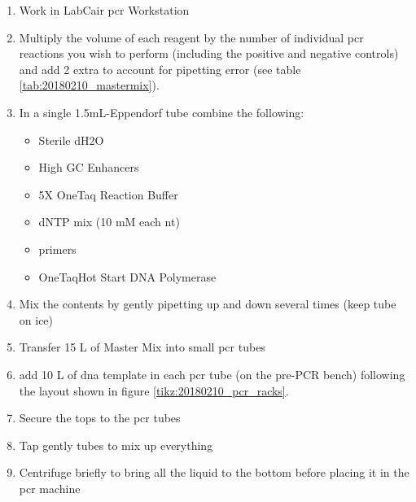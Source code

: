 \begin{enumerate}
\item Work in LabCair \gls{pcr} Workstation
\item Multiply the volume of each reagent by the number of individual \gls{pcr} reactions you wish to perform (including the positive and negative controls) and add 2 extra to account for pipetting error (see table \ref{tab:20180210_mastermix}).
\item In a single 1.5mL-Eppendorf tube combine the following:
	\begin{itemize}
	\item Sterile dH2O
	\item High GC Enhancers
	\item 5X OneTaq Reaction Buffer
	\item dNTP mix (10 mM each nt)
	\item primers
	\item OneTaq\cR Hot Start DNA Polymerase
	\end{itemize}
\item Mix the contents by gently pipetting up and down several times (keep tube on ice)
\item Transfer  15 \textmu L of Master Mix into small \gls{pcr} tubes
\item add 10 \textmu L of \gls{dna} template in each \gls{pcr} tube (on the pre-PCR bench) following the layout shown in figure \ref{tikz:20180210_pcr_racks}.
\item Secure the tops to the \gls{pcr} tubes
\item Tap gently tubes to mix up everything
\item Centrifuge briefly to bring all the liquid to the bottom before placing it in the \gls{pcr} machine
\end{enumerate}

